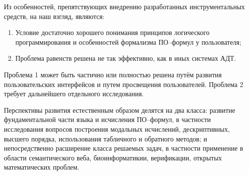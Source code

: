

Из особенностей, препятствующих внедрению разработанных инструментальных средств, на наш взгляд, являются:

\begin{enumerate}
\item Условие достаточно хорошего понимания принципов логического программирования и особенностей формализма ПО--формул у пользователя;
\item Проблема равенств решена не так эффективно, как в иных системах АДТ.
\end{enumerate}

Проблема 1 может быть частично или полностью решена путём развития пользовательских интерфейсов и путем просвещения пользователей. Проблема 2 требует дальнейшего отдельного исследования.


Перспективы развития естественным образом делятся на два класса: развитие фундаментальной части языка и исчисления ПО--формул, в частности исследования вопросов построения модальных исчислений, дескриптивных, высшего порядка, использования табличного и обратного методов; и непосредственно расширение класса решаемых задач, в частности применение в области семантического веба, биоинформатикии, верификации, открытых математических проблем.



